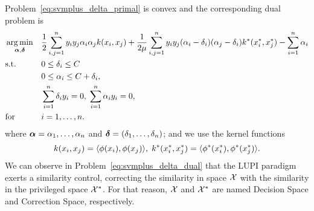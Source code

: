 Problem~\eqref{eq:svmplus_delta_primal} is convex and the corresponding dual problem is
\begin{equation}\label{eq:svmplus_delta_dual}
    \begin{aligned}
        & \argmin_{\myvec{\alpha}, \myvec{\delta}} 
        & & \frac{1}{2} \sum_{i, j=1}^\nsamples y_i y_j \alpha_i \alpha_j k(x_i, x_j) +\frac{1}{2 \mu} \sum_{i, j=1}^\nsamples y_i y_j (\alpha_i - \delta_i) (\alpha_j - \delta_i) k^*(x^*_i, x^*_j)  - \sum_{i=1}^\nsamples \alpha_i \\
        & \text{s.t.}
        & & 0 \leq \delta_i \leq C \\
        & & & 0 \leq \alpha_i \leq C + \delta_i, \\
        & & & \sum_{i=1}^{\nsamples}{\delta_i y_i} = 0, \; 
        \sum_{i=1}^{\nsamples}{\alpha_i y_i} = 0, \\
        & \text{for } & & i=1, \ldots, \nsamples.
        \end{aligned}
\end{equation}
where $\bm{\alpha} = \alpha_1, \ldots, \alpha_n$ and $\bm{\delta} = (\delta_1, \ldots, \delta_n)$; and we use the kernel functions
$$k(x_i, x_j) = \langle \phi(x_i), \phi(x_j) \rangle, \; k^*(x^*_i, x^*_j) = \langle \phi^*(x^*_i), \phi^*(x^*_j) \rangle.$$ 
We can observe in Problem~\eqref{eq:svmplus_delta_dual} that the LUPI paradigm exerts a similarity control, correcting the similarity in space $\mathcal{X}$ with the similarity in the privileged space $\mathcal{X}^*$. For that reason, $\mathcal{X}$ and $\mathcal{X}^*$ are named Decision Space and Correction Space, respectively.


